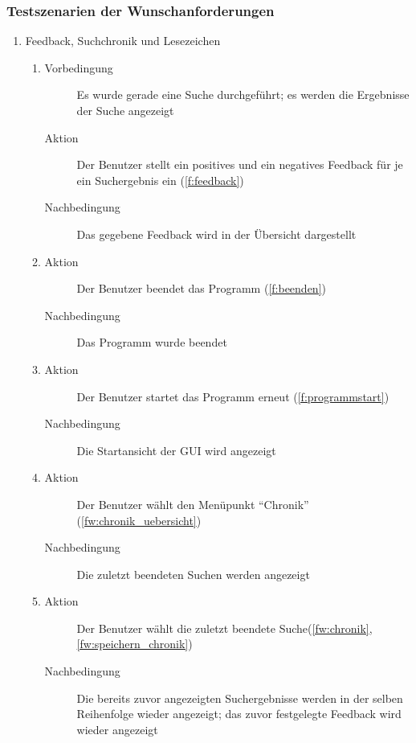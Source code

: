 \subsubsection{Testszenarien der Wunschanforderungen}
\begin{enumerate} [label=\bfseries /TSW \arabic*0/, leftmargin=*]
	\item Feedback, Suchchronik und Lesezeichen \label{ts:feedback_chronik_lesezeichen}
	\begin{enumerate}[leftmargin=0pt]
		\item
		\begin{description}
			\item[Vorbedingung] Es wurde gerade eine Suche durchgeführt; es werden die Ergebnisse der Suche angezeigt
			\item[Aktion] Der Benutzer stellt ein positives und ein negatives Feedback für je ein Suchergebnis ein (\ref{f:feedback})
			\item[Nachbedingung] Das gegebene Feedback wird in der Übersicht dargestellt
		\end{description}
		\item
		\begin{description}
			\item[Aktion] Der Benutzer beendet das Programm (\ref{f:beenden})
			\item[Nachbedingung] Das Programm wurde beendet
		\end{description}
		\item
		\begin{description}
			\item[Aktion] Der Benutzer startet das Programm erneut (\ref{f:programmstart})
			\item[Nachbedingung] Die Startansicht der GUI wird angezeigt
		\end{description}
		\item
		\begin{description}
			\item[Aktion] Der Benutzer wählt den Menüpunkt \enquote{Chronik} (\ref{fw:chronik_uebersicht})
			\item[Nachbedingung] Die zuletzt beendeten Suchen werden angezeigt
		\end{description}
		\item
		\begin{description}
			\item[Aktion] Der Benutzer wählt die zuletzt beendete Suche(\ref{fw:chronik}, \ref{fw:speichern_chronik})
			\item[Nachbedingung] Die bereits zuvor angezeigten Suchergebnisse werden in der selben Reihenfolge wieder angezeigt; das zuvor festgelegte Feedback wird wieder angezeigt

\end{description}
\end{enumerate}
\end{enumerate}
